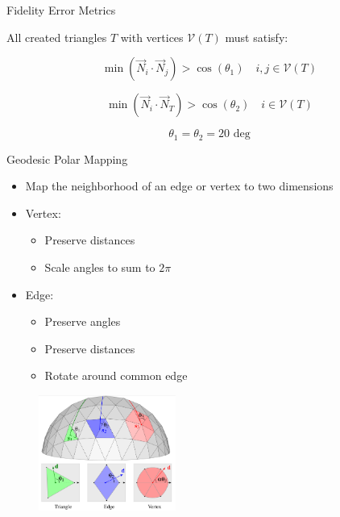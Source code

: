\documentclass{beamer}
\begin{document}
\begin{frame}[plain]{Fidelity Error Metrics}

  All created triangles $T$  with vertices $\mathcal V(T)$ must satisfy:
  
  \[\min( \vec N_i \cdot \vec N_j) > \cos(\theta_1) \quad i,j \in \mathcal V(T) \]
  
  \[\min( \vec N_i \cdot \vec N_T) > \cos(\theta_2) \quad i \in \mathcal V(T) \]

  \[ \theta_1 = \theta_2 = 20 \text{ deg} \]
  
\end{frame}

\begin{frame}[plain]{Geodesic Polar Mapping}

  \begin{itemize}
  \item Map the neighborhood of an edge or vertex to two dimensions
  \item Vertex:
    \begin{itemize}
    \item Preserve distances
    \item Scale angles to sum to $2\pi$
    \end{itemize}
  \item Edge:
    \begin{itemize}
    \item Preserve angles
    \item Preserve distances  
    \item Rotate around common edge
    \end{itemize}
  \end{itemize}

  \begin{figure}
    \includegraphics[width=0.4\textwidth]{../image/geodesic.png}
  \end{figure}
  
\end{frame}
\end{document}
